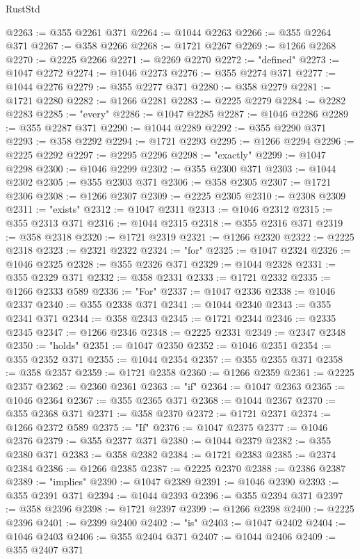 \begin{lexlean}{RustStd}
\begin{coremodule}
@2263 := @355 @2261 @371
@2264 := @1044 @2263
@2266 := @355 @2264 @371
@2267 := @358 @2266
@2268 := @1721 @2267
@2269 := @1266 @2268
@2270 := @2225 @2266
@2271 := @2269 @2270
@2272 := "defined"
@2273 := @1047 @2272
@2274 := @1046 @2273
@2276 := @355 @2274 @371
@2277 := @1044 @2276
@2279 := @355 @2277 @371
@2280 := @358 @2279
@2281 := @1721 @2280
@2282 := @1266 @2281
@2283 := @2225 @2279
@2284 := @2282 @2283
@2285 := "every"
@2286 := @1047 @2285
@2287 := @1046 @2286
@2289 := @355 @2287 @371
@2290 := @1044 @2289
@2292 := @355 @2290 @371
@2293 := @358 @2292
@2294 := @1721 @2293
@2295 := @1266 @2294
@2296 := @2225 @2292
@2297 := @2295 @2296
@2298 := "exactly"
@2299 := @1047 @2298
@2300 := @1046 @2299
@2302 := @355 @2300 @371
@2303 := @1044 @2302
@2305 := @355 @2303 @371
@2306 := @358 @2305
@2307 := @1721 @2306
@2308 := @1266 @2307
@2309 := @2225 @2305
@2310 := @2308 @2309
@2311 := "exists"
@2312 := @1047 @2311
@2313 := @1046 @2312
@2315 := @355 @2313 @371
@2316 := @1044 @2315
@2318 := @355 @2316 @371
@2319 := @358 @2318
@2320 := @1721 @2319
@2321 := @1266 @2320
@2322 := @2225 @2318
@2323 := @2321 @2322
@2324 := "for"
@2325 := @1047 @2324
@2326 := @1046 @2325
@2328 := @355 @2326 @371
@2329 := @1044 @2328
@2331 := @355 @2329 @371
@2332 := @358 @2331
@2333 := @1721 @2332
@2335 := @1266 @2333 @589
@2336 := "For"
@2337 := @1047 @2336
@2338 := @1046 @2337
@2340 := @355 @2338 @371
@2341 := @1044 @2340
@2343 := @355 @2341 @371
@2344 := @358 @2343
@2345 := @1721 @2344
@2346 := @2335 @2345
@2347 := @1266 @2346
@2348 := @2225 @2331
@2349 := @2347 @2348
@2350 := "holds"
@2351 := @1047 @2350
@2352 := @1046 @2351
@2354 := @355 @2352 @371
@2355 := @1044 @2354
@2357 := @355 @2355 @371
@2358 := @358 @2357
@2359 := @1721 @2358
@2360 := @1266 @2359
@2361 := @2225 @2357
@2362 := @2360 @2361
@2363 := "if"
@2364 := @1047 @2363
@2365 := @1046 @2364
@2367 := @355 @2365 @371
@2368 := @1044 @2367
@2370 := @355 @2368 @371
@2371 := @358 @2370
@2372 := @1721 @2371
@2374 := @1266 @2372 @589
@2375 := "If"
@2376 := @1047 @2375
@2377 := @1046 @2376
@2379 := @355 @2377 @371
@2380 := @1044 @2379
@2382 := @355 @2380 @371
@2383 := @358 @2382
@2384 := @1721 @2383
@2385 := @2374 @2384
@2386 := @1266 @2385
@2387 := @2225 @2370
@2388 := @2386 @2387
@2389 := "implies"
@2390 := @1047 @2389
@2391 := @1046 @2390
@2393 := @355 @2391 @371
@2394 := @1044 @2393
@2396 := @355 @2394 @371
@2397 := @358 @2396
@2398 := @1721 @2397
@2399 := @1266 @2398
@2400 := @2225 @2396
@2401 := @2399 @2400
@2402 := "is"
@2403 := @1047 @2402
@2404 := @1046 @2403
@2406 := @355 @2404 @371
@2407 := @1044 @2406
@2409 := @355 @2407 @371

\end{coremodule}
\end{lexlean}
